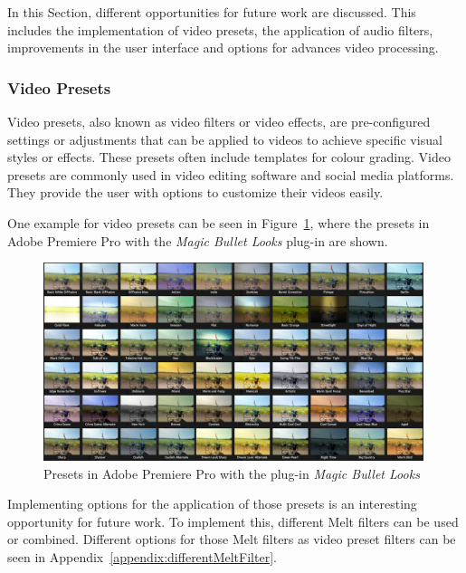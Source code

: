 \documentclass[../MasterThesis.tex]{subfiles}
\begin{document}
In this Section, different opportunities for future work are discussed. This includes the implementation of video presets, the application of audio filters, improvements in the user interface and options for advances video processing.


\subsubsection*{Video Presets}

Video presets, also known as video filters or video effects, are pre-configured settings or adjustments that can be applied to videos to achieve specific visual styles or effects. 
These presets often include templates for colour grading. 
Video presets are commonly used in video editing software and social media platforms. They provide the user with options to customize their videos easily. 

One example for video presets can be seen in Figure~\ref{figure:app}, where the presets in Adobe Premiere Pro with the \textit{Magic Bullet Looks} plug-in are shown.~\cite{premierepro, magicbullet}

\begin{figure}[H]
	
	\centering
	
	\includegraphics[width=0.99\textwidth]{app.png}
	
	\caption[Presets in Adobe Premiere Pro (\textit{Magic Bullet Looks})]{Presets in Adobe Premiere Pro with the plug-in \textit{Magic Bullet Looks}~\cite{premierepro, magicbullet}}
	\label{figure:app}
	
\end{figure}

Implementing options for the application of those presets is an interesting opportunity for future work. To implement this, different Melt filters can be used or combined. Different options for those Melt filters as video preset filters can be seen in Appendix~\ref{appendix:differentMeltFilter}.
\end{document}
